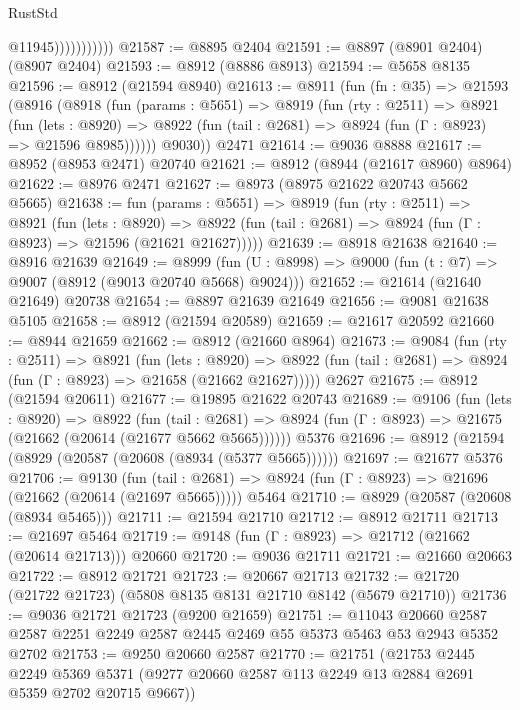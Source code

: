 \begin{lexlean}{RustStd}
\begin{coremodule}
                          @11945)))))))))))
@21587 := @8895 @2404
@21591 := @8897 (@8901 @2404) (@8907 @2404)
@21593 := @8912 (@8886 @8913)
@21594 := @5658 @8135
@21596 := @8912 (@21594 @8940)
@21613 := @8911
    (fun (fn : @35) =>
    @21593
      (@8916
        (@8918
          (fun (params : @5651) =>
          @8919
            (fun (rty : @2511) =>
            @8921
              (fun (lets : @8920) =>
              @8922 (fun (tail : @2681) => @8924 (fun (Γ : @8923) => @21596 @8985))))))
        @9030))
    @2471
@21614 := @9036 @8888
@21617 := @8952 (@8953 @2471) @20740
@21621 := @8912 (@8944 (@21617 @8960) @8964)
@21622 := @8976 @2471
@21627 := @8973 (@8975 @21622 @20743 @5662 @5665)
@21638 := fun (params : @5651) =>
  @8919
    (fun (rty : @2511) =>
    @8921
      (fun (lets : @8920) =>
      @8922 (fun (tail : @2681) => @8924 (fun (Γ : @8923) => @21596 (@21621 @21627)))))
@21639 := @8918 @21638
@21640 := @8916 @21639
@21649 := @8999
    (fun (U : @8998) => @9000 (fun (t : @7) => @9007 (@8912 (@9013 @20740 @5668) @9024)))
@21652 := @21614 (@21640 @21649) @20738
@21654 := @8897 @21639 @21649
@21656 := @9081 @21638 @5105
@21658 := @8912 (@21594 @20589)
@21659 := @21617 @20592
@21660 := @8944 @21659
@21662 := @8912 (@21660 @8964)
@21673 := @9084
    (fun (rty : @2511) =>
    @8921
      (fun (lets : @8920) =>
      @8922 (fun (tail : @2681) => @8924 (fun (Γ : @8923) => @21658 (@21662 @21627)))))
    @2627
@21675 := @8912 (@21594 @20611)
@21677 := @19895 @21622 @20743
@21689 := @9106
    (fun (lets : @8920) =>
    @8922
      (fun (tail : @2681) =>
      @8924 (fun (Γ : @8923) => @21675 (@21662 (@20614 (@21677 @5662 @5665))))))
    @5376
@21696 := @8912 (@21594 (@8929 (@20587 (@20608 (@8934 (@5377 @5665))))))
@21697 := @21677 @5376
@21706 := @9130
    (fun (tail : @2681) => @8924 (fun (Γ : @8923) => @21696 (@21662 (@20614 (@21697 @5665)))))
    @5464
@21710 := @8929 (@20587 (@20608 (@8934 @5465)))
@21711 := @21594 @21710
@21712 := @8912 @21711
@21713 := @21697 @5464
@21719 := @9148 (fun (Γ : @8923) => @21712 (@21662 (@20614 @21713))) @20660
@21720 := @9036 @21711
@21721 := @21660 @20663
@21722 := @8912 @21721
@21723 := @20667 @21713
@21732 := @21720 (@21722 @21723) (@5808 @8135 @8131 @21710 @8142 (@5679 @21710))
@21736 := @9036 @21721 @21723 (@9200 @21659)
@21751 := @11043
    @20660
    @2587
    @2587
    @2251
    @2249
    @2587
    @2445
    @2469
    @55
    @5373
    @5463
    @53
    @2943
    @5352
    @2702
@21753 := @9250 @20660 @2587
@21770 := @21751
    (@21753
      @2445
      @2249
      @5369
      @5371
      (@9277 @20660 @2587 @113 @2249 @13 @2884 @2691 @5359 @2702 @20715 @9667))

\end{coremodule}
\end{lexlean}

